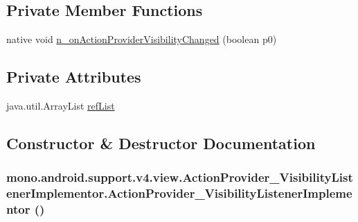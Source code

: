 \subsection*{Private Member Functions}
\begin{CompactItemize}
\item 
native void \hyperlink{classmono_1_1android_1_1support_1_1v4_1_1view_1_1_action_provider___visibility_listener_implementor_80453f2f9a0ac0dfd78425e0bcc16de5}{n\_\-onActionProviderVisibilityChanged} (boolean p0)
\end{CompactItemize}
\subsection*{Private Attributes}
\begin{CompactItemize}
\item 
java.util.ArrayList \hyperlink{classmono_1_1android_1_1support_1_1v4_1_1view_1_1_action_provider___visibility_listener_implementor_c59b087212168bc4fdc6427b368abd04}{refList}
\end{CompactItemize}


\subsection{Constructor \& Destructor Documentation}
\hypertarget{classmono_1_1android_1_1support_1_1v4_1_1view_1_1_action_provider___visibility_listener_implementor_54c95cb9758679e3b2254d2e794225ec}{
\subsubsection[{ActionProvider\_\-VisibilityListenerImplementor}]{\setlength{\rightskip}{0pt plus 5cm}mono.android.support.v4.view.ActionProvider\_\-VisibilityListenerImplementor.ActionProvider\_\-VisibilityListenerImplementor ()}}
\label{classmono_1_1android_1_1support_1_1v4_1_1view_1_1_action_provider___visibility_listener_implementor_54c95cb9758679e3b2254d2e794225ec}




